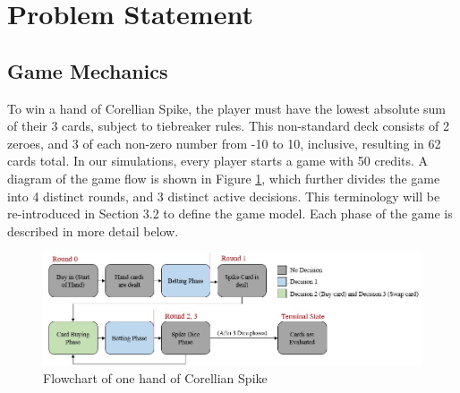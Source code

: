 \documentclass{article}
\begin{document}
\section{Problem Statement}
\subsection{Game Mechanics} %

To win a hand of Corellian Spike, the player must have the lowest absolute sum of their 3 cards, subject to tiebreaker rules. This non-standard deck consists of 2 zeroes, and 3 of each non-zero number from -10 to 10, inclusive, resulting in 62 cards total. In our simulations, every player starts a game with 50 credits. A diagram of the game flow is shown in Figure \ref{fig:flowchart}, which further divides the game into 4 distinct rounds, and 3 distinct active decisions. This terminology will be re-introduced in Section 3.2 to define the game model. Each phase of the game is described in more detail below.

\begin{figure}[ht!]
    \centering
    \includegraphics[width=.9\textwidth]{figures/flowchart.jpg}
    \caption{Flowchart of one hand of Corellian Spike}
    \label{fig:flowchart}
\end{figure}
\end{document}
